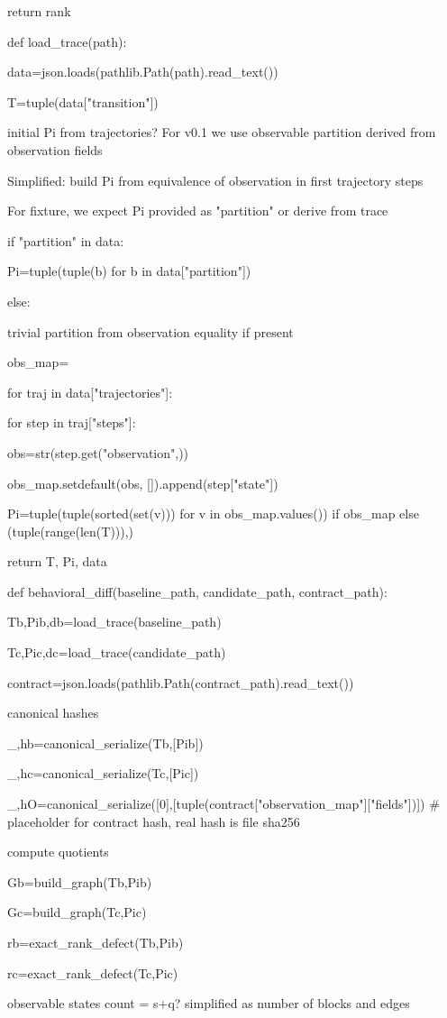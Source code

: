 return rank


def load_trace(path):

data=json.loads(pathlib.Path(path).read_text())

T=tuple(data["transition"])


initial Pi from trajectories? For v0.1 we use observable partition derived from observation fields


Simplified: build Pi from equivalence of observation in first trajectory steps


For fixture, we expect Pi provided as "partition" or derive from trace


if "partition" in data:

Pi=tuple(tuple(b) for b in data["partition"])

else:


trivial partition from observation equality if present


obs_map={}

for traj in data["trajectories"]:

for step in traj["steps"]:

obs=str(step.get("observation",{}))

obs_map.setdefault(obs, []).append(step["state"])

Pi=tuple(tuple(sorted(set(v))) for v in obs_map.values()) if obs_map else (tuple(range(len(T))),)

return T, Pi, data


def behavioral_diff(baseline_path, candidate_path, contract_path):

Tb,Pib,db=load_trace(baseline_path)

Tc,Pic,dc=load_trace(candidate_path)

contract=json.loads(pathlib.Path(contract_path).read_text())


canonical hashes


_,hb=canonical_serialize(Tb,[Pib])

_,hc=canonical_serialize(Tc,[Pic])

_,hO=canonical_serialize([0],[tuple(contract["observation_map"]["fields"])])  # placeholder for contract hash, real hash is file sha256


compute quotients


Gb=build_graph(Tb,Pib)

Gc=build_graph(Tc,Pic)

rb=exact_rank_defect(Tb,Pib)

rc=exact_rank_defect(Tc,Pic)


observable states count = s+q? simplified as number of blocks and edges


